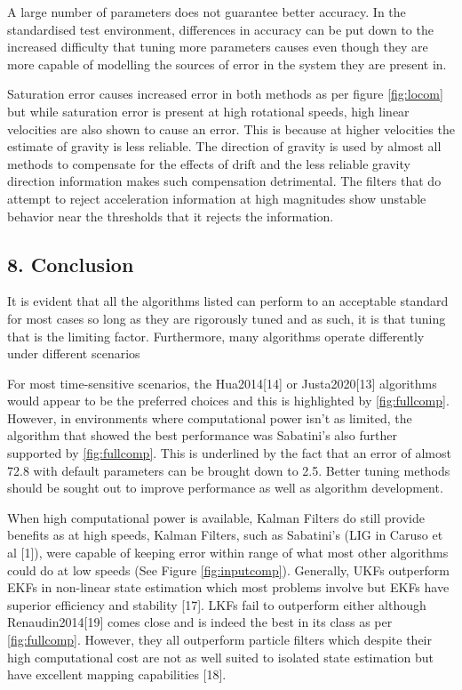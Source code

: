 \documentclass[10pt]{report}
\begin{document}
A large number of parameters does not guarantee better accuracy. In the standardised test environment, differences in accuracy can be put down to the increased difficulty that tuning more parameters causes even though they are more capable of modelling the sources of error in the system they are present in.

Saturation error causes increased error in both methods as per figure \ref{fig:locom} but while saturation error is present at high rotational speeds, high linear velocities are also shown to cause an error. This is because at higher velocities the estimate of gravity is less reliable. The direction of gravity is used by almost all methods to compensate for the effects of drift and the less reliable gravity direction information makes such compensation detrimental. The filters that do attempt to reject acceleration information at high magnitudes show unstable behavior near the thresholds that it rejects the information.





\subsection*{8. Conclusion}
It is evident that all the algorithms listed can perform to an acceptable standard for most cases so long as they are rigorously tuned and as such, it is that tuning that is the limiting factor. Furthermore, many algorithms operate differently under different scenarios

For most time-sensitive scenarios, the Hua2014[14] or Justa2020[13] algorithms would appear to be the preferred choices and this is highlighted by \ref{fig:fullcomp}. However, in environments where computational power isn’t as limited, the algorithm that showed the best performance was Sabatini's also further supported by \ref{fig:fullcomp}. This is underlined by the fact that an error of almost 72.8 with default parameters can be brought down to 2.5. Better tuning methods should be sought out to improve performance as well as algorithm development.

When high computational power is available, Kalman Filters do still provide benefits as at high speeds, Kalman Filters, such as Sabatini's (LIG in Caruso et al [1]), were capable of keeping error within range of what most other algorithms could do at low speeds (See Figure \ref{fig:inputcomp}). Generally, UKFs outperform EKFs in non-linear state estimation which most problems involve but EKFs have superior efficiency and stability [17]. LKFs fail to outperform either although Renaudin2014[19] comes close and is indeed the best in its class as per  \ref{fig:fullcomp}. However, they all outperform particle filters which despite their high computational cost are not as well suited to isolated state estimation but have excellent mapping capabilities [18].
\end{document}
